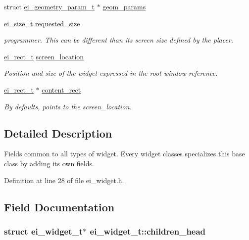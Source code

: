 \begin{DoxyCompactItemize}
\item 
struct \hyperlink{structei__geometry__param__t}{ei\-\_\-geometry\-\_\-param\-\_\-t} $\ast$ \hyperlink{structei__widget__t_a31885277c641803a931fff1d6256203f}{geom\-\_\-params}
\item 
\hyperlink{structei__size__t}{ei\-\_\-size\-\_\-t} \hyperlink{structei__widget__t_ae82b19958b3ec72a855986dffb9b92ea}{requested\-\_\-size}
\begin{DoxyCompactList}\small\item\em programmer. This can be different than its screen size defined by the placer. \end{DoxyCompactList}\item 
\hyperlink{structei__rect__t}{ei\-\_\-rect\-\_\-t} \hyperlink{structei__widget__t_ad139e1541329b54e0b4c8d746e14b204}{screen\-\_\-location}
\begin{DoxyCompactList}\small\item\em Position and size of the widget expressed in the root window reference. \end{DoxyCompactList}\item 
\hyperlink{structei__rect__t}{ei\-\_\-rect\-\_\-t} $\ast$ \hyperlink{structei__widget__t_a75c29d388a5f5b32cdd8a9c855bc2a75}{content\-\_\-rect}
\begin{DoxyCompactList}\small\item\em By defaults, points to the screen\-\_\-location. \end{DoxyCompactList}\end{DoxyCompactItemize}


\subsection{Detailed Description}
Fields common to all types of widget. Every widget classes specializes this base class by adding its own fields. 

Definition at line 28 of file ei\-\_\-widget.\-h.



\subsection{Field Documentation}
\hypertarget{structei__widget__t_a190316f0ec41d2d98b919414c860f828}{
\subsubsection[{children\-\_\-head}]{\setlength{\rightskip}{0pt plus 5cm}struct {\bf ei\-\_\-widget\-\_\-t}$\ast$ ei\-\_\-widget\-\_\-t\-::children\-\_\-head}}\label{structei__widget__t_a190316f0ec41d2d98b919414c860f828}


